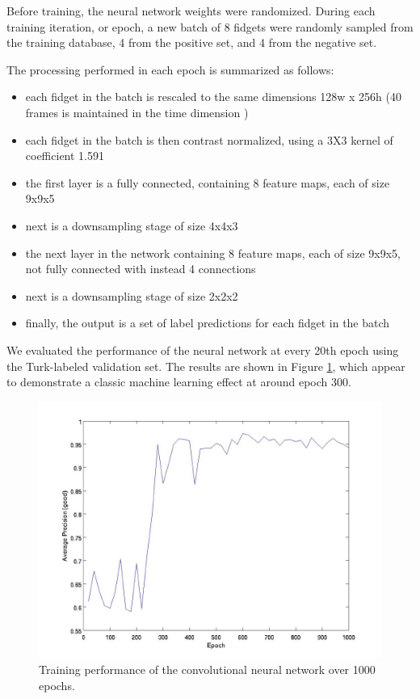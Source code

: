 \documentclass[times, 10pt,twocolumn]{article}
\begin{document}
Before training, the neural network weights were randomized.  During each training iteration, or epoch, a new batch of 8 fidgets were randomly sampled from the training database,  4 from the positive set, and 4 from the negative set.  

The processing performed in each epoch is summarized as follows:
\begin{itemize}
\item each fidget in the batch is rescaled to the same dimensions 128w x 256h (40 frames is maintained in the time dimension )
\item each fidget in the batch is then contrast normalized, using a 3X3 kernel of coefficient 1.591
\item the first layer is a fully connected, containing 8 feature maps, each of size 9x9x5
\item next is a downsampling stage of size 4x4x3
\item the next layer in the network containing 8 feature maps, each of size 9x9x5, not fully connected with instead 4 connections
\item next is a downsampling stage of size 2x2x2
\item finally, the output is a set of label predictions for each fidget in the batch
\end{itemize}

We evaluated the performance of the neural network at every 20th epoch using the Turk-labeled validation set.  The results are shown in Figure \ref{fig_graph}, which appear to demonstrate a classic machine learning effect at around epoch 300.

\begin{figure}[bt]
\centering
\includegraphics[width=0.96\columnwidth]{avg_prec}
\caption{\label{fig_graph} \small Training performance of the convolutional neural network over 1000 epochs. }
\end{figure}
\end{document}
